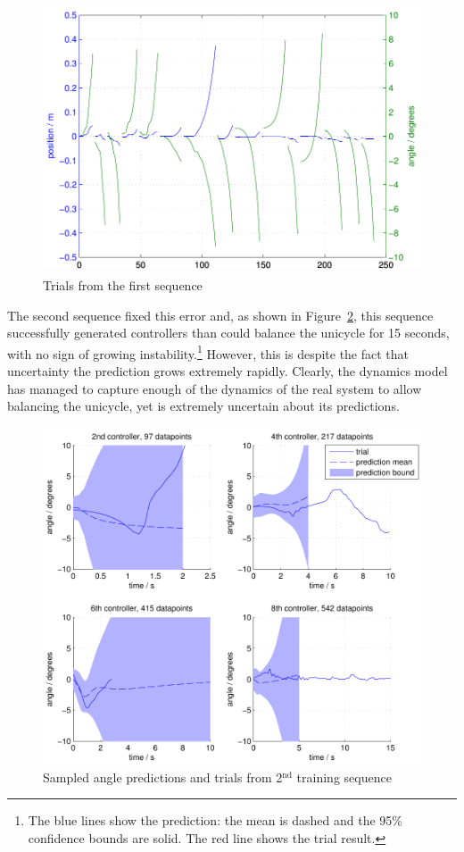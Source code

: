 \documentclass{IIBproject}
\begin{document}
\begin{figure}[htpb]
  \begin{center}
    \includegraphics[height=8cm]{high_dist_loss.pdf}
    \end{center}
    \caption{Trials from the first sequence}
    \label{fig:high_dist_loss}
    \end{figure}

The second sequence fixed this error and, as shown in
Figure~\ref{fig:2nd_sequence}, this sequence successfully generated
controllers than could balance the unicycle for 15 seconds, with no sign of
growing instability.\footnote{The blue lines show the prediction: the mean is
dashed and the 95\% confidence bounds are solid. The red line shows the trial
result.} However, this is despite the fact that uncertainty the prediction
grows extremely rapidly. Clearly, the dynamics model has managed to capture
enough of the dynamics of the real system to allow balancing the unicycle, yet
is extremely uncertain about its predictions.

\begin{figure}[htpb]
  \begin{center}
    \includegraphics[width=15cm]{2nd_sequence_2.pdf}
    \end{center}
    \caption{Sampled angle predictions and trials from 2$^\textrm{nd}$ training
    sequence}
    \label{fig:2nd_sequence}
    \end{figure}
\end{document}
